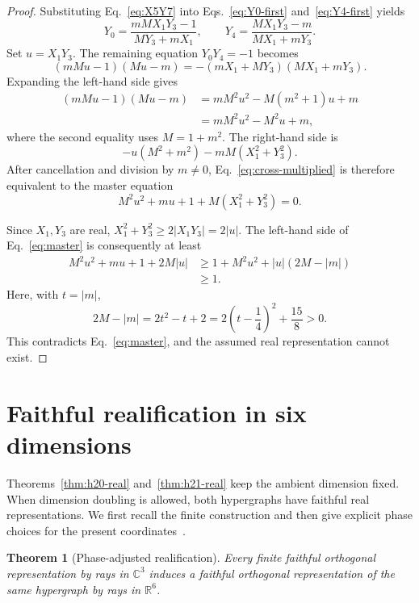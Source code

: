 \documentclass[12pt,a4paper]{article}
\newtheorem{theorem}{Theorem}
\theoremstyle{definition}
\theoremstyle{remark}
\newcommand{\C}{\mathbb C}
\newcommand{\R}{\mathbb R}
\begin{document}
\begin{proof}
Substituting Eq.~\eqref{eq:X5Y7} into
Eqs.~\eqref{eq:Y0-first} and~\eqref{eq:Y4-first} yields
\begin{equation}
 Y_0=\frac{mMX_1Y_3-1}{MY_3+mX_1},\qquad
 Y_4=\frac{MX_1Y_3-m}{MX_1+mY_3}.
 \label{eq:Y0Y4-final}
\end{equation}
Set $u=X_1Y_3$.  The remaining equation $Y_0Y_4=-1$ becomes
\begin{equation}
 (mMu-1)(Mu-m)=-(mX_1+MY_3)(MX_1+mY_3).
 \label{eq:cross-multiplied}
\end{equation}
Expanding the left-hand side gives
\begin{align*}
 (mMu-1)(Mu-m)
 &=mM^2u^2-M(m^2+1)u+m\\
 &=mM^2u^2-M^2u+m,
\end{align*}
where the second equality uses $M=1+m^2$.
The right-hand side is
\[
 -u(M^2+m^2)-mM(X_1^2+Y_3^2).
\]
After cancellation and division by $m\ne0$, Eq.~\eqref{eq:cross-multiplied}
is therefore equivalent to the master equation
\begin{equation}
 M^2u^2+mu+1+M(X_1^2+Y_3^2)=0.
 \label{eq:master}
\end{equation}

Since $X_1,Y_3$ are real,
$X_1^2+Y_3^2\ge2|X_1Y_3|=2|u|$.  The left-hand side of
Eq.~\eqref{eq:master} is consequently at least
\begin{align*}
 M^2u^2+mu+1+2M|u|
 &\ge 1+M^2u^2+|u|(2M-|m|)\\
 &\ge1.
\end{align*}
Here, with $t=|m|$,
\[
 2M-|m|=2t^2-t+2=2\left(t-\frac14\right)^2+\frac{15}{8}>0.
\]
This contradicts
Eq.~\eqref{eq:master}, and the assumed real representation cannot exist.
\end{proof}

\section{Faithful realification in six dimensions}
\label{sec:realification}

Theorems~\ref{thm:h20-real} and~\ref{thm:h21-real} keep the ambient
dimension fixed.  When dimension doubling is allowed, both hypergraphs have
faithful real representations.  We first recall the finite construction and
then give explicit phase choices for the present
coordinates~\cite{svozil-2025-rvc}.

\begin{theorem}[Phase-adjusted realification]
\label{thm:realification}
Every finite faithful orthogonal representation by rays in $\C^3$ induces a
faithful orthogonal representation of the same hypergraph by rays in $\R^6$.
\end{theorem}
\end{document}
